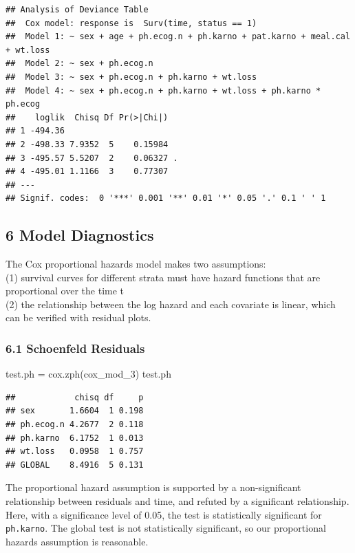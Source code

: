 \documentclass[
]{article}
\newenvironment{Shaded}{\begin{snugshade}}{\end{snugshade}}
\newcommand{\FunctionTok}[1]{\textcolor[rgb]{0.00,0.00,0.00}{#1}}
\newcommand{\NormalTok}[1]{#1}
\newcommand{\OtherTok}[1]{\textcolor[rgb]{0.56,0.35,0.01}{#1}}
\begin{document}
\begin{verbatim}
## Analysis of Deviance Table
##  Cox model: response is  Surv(time, status == 1)
##  Model 1: ~ sex + age + ph.ecog.n + ph.karno + pat.karno + meal.cal + wt.loss
##  Model 2: ~ sex + ph.ecog.n
##  Model 3: ~ sex + ph.ecog.n + ph.karno + wt.loss
##  Model 4: ~ sex + ph.ecog.n + ph.karno + wt.loss + ph.karno * ph.ecog
##    loglik  Chisq Df Pr(>|Chi|)  
## 1 -494.36                       
## 2 -498.33 7.9352  5    0.15984  
## 3 -495.57 5.5207  2    0.06327 .
## 4 -495.01 1.1166  3    0.77307  
## ---
## Signif. codes:  0 '***' 0.001 '**' 0.01 '*' 0.05 '.' 0.1 ' ' 1
\end{verbatim}

\hypertarget{model-diagnostics}{%
\subsection{6 Model Diagnostics}\label{model-diagnostics}}

The Cox proportional hazards model makes two assumptions:\\
(1) survival curves for different strata must have hazard functions that
are proportional over the time t\\
(2) the relationship between the log hazard and each covariate is
linear, which can be verified with residual plots.

\hypertarget{schoenfeld-residuals}{%
\subsubsection{6.1 Schoenfeld Residuals}\label{schoenfeld-residuals}}

\begin{Shaded}
\begin{Highlighting}[]
\NormalTok{test.ph }\OtherTok{=} \FunctionTok{cox.zph}\NormalTok{(cox\_mod\_3)}
\NormalTok{test.ph}
\end{Highlighting}
\end{Shaded}

\begin{verbatim}
##            chisq df     p
## sex       1.6604  1 0.198
## ph.ecog.n 4.2677  2 0.118
## ph.karno  6.1752  1 0.013
## wt.loss   0.0958  1 0.757
## GLOBAL    8.4916  5 0.131
\end{verbatim}

The proportional hazard assumption is supported by a non-significant
relationship between residuals and time, and refuted by a significant
relationship. Here, with a significance level of 0.05, the test is
statistically significant for \texttt{ph.karno}. The global test is not
statistically significant, so our proportional hazards assumption is
reasonable.
\end{document}
